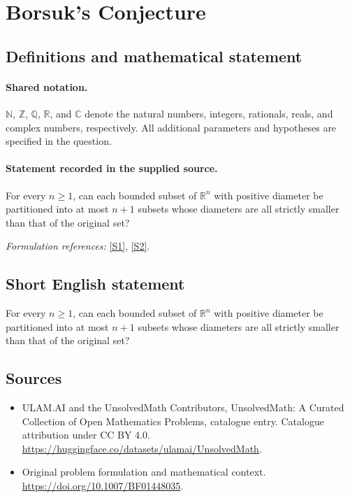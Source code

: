 \documentclass[11pt]{article}
\newcommand{\sref}[2]{\hyperlink{source:#1:#2}{[S#2]}}
\begin{document}
\section{Borsuk's Conjecture}\label{statement}

\subsection{Definitions and mathematical statement}

\paragraph{Shared notation.}$\mathbb N$, $\mathbb Z$, $\mathbb Q$, $\mathbb R$, and $\mathbb C$ denote the natural numbers, integers, rationals, reals, and complex numbers, respectively. All additional parameters and hypotheses are specified in the question.


\paragraph{Statement recorded in the supplied source.}
For every $n\geq1$, can each bounded subset of $\mathbb R^n$ with positive diameter be partitioned into at most $n+1$ subsets whose diameters are all strictly smaller than that of the original set?
\par\smallskip\textit{Formulation references:} \sref{statement}{1}, \sref{statement}{2}.
\subsection{Short English statement}
For every $n\geq1$, can each bounded subset of $\mathbb R^n$ with positive diameter be partitioned into at most $n+1$ subsets whose diameters are all strictly smaller than that of the original set?
\subsection{Sources}
\begin{itemize}
\item[\hypertarget{source:statement:1}{S1}] ULAM.AI and the UnsolvedMath Contributors, UnsolvedMath: A Curated Collection of Open Mathematics Problems, catalogue entry. Catalogue attribution under CC BY 4.0.
\url{https://huggingface.co/datasets/ulamai/UnsolvedMath}.
\item[\hypertarget{source:statement:2}{S2}] Original problem formulation and mathematical context.
\url{https://doi.org/10.1007/BF01448035}.
\end{itemize}
\label{end:statement}
\end{document}
